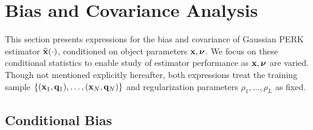\section{Bias and Covariance Analysis}
\label{s,perk,perf}

This section presents expressions
for the bias and covariance
of Gaussian PERK estimator $\esta{\bmx}{\cdot}$,
conditioned on object parameters $\mathbf{x},\boldsymbol{\nu}$.
We focus on these conditional statistics
to enable study
of estimator performance 
as $\mathbf{x},\boldsymbol{\nu}$ are varied.
Though not mentioned explicitly hereafter,
both expressions treat the training sample
$\set{\paren{\bmx_1,\bmq_1},\dots,\paren{\bmx_N,\bmq_N}}$
and regularization parameters $\rho_1,\dots,\rho_L$
as fixed.

\subsection{Conditional Bias}
\label{ss,perk,perf,bias}

